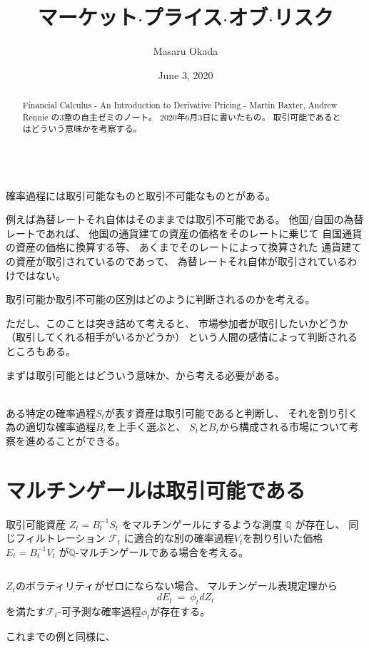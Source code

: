 \documentclass[uplatex,a4j,12pt,dvipdfmx]{jsarticle}
\title{
マーケット$\cdot$プライス$\cdot$オブ$\cdot$リスク
}
\author{Masaru Okada}
\date{June 3, 2020}
\begin{document}
\maketitle

\begin{abstract}
	Financial Calculus - An Introduction to Derivative Pricing - Martin Baxter, Andrew Rennie の3章の自主ゼミのノート。
	2020年6月3日に書いたもの。
	取引可能であるとはどういう意味かを考察する。
\end{abstract}

\ \\

確率過程には取引可能なものと取引不可能なものとがある。

例えば為替レートそれ自体はそのままでは取引不可能である。
他国/自国の為替レートであれば、
他国の通貨建ての資産の価格をそのレートに乗じて
自国通貨の資産の価格に換算する等、
あくまでそのレートによって換算された
通貨建ての資産が取引されているのであって、
為替レートそれ自体が取引されているわけではない。

取引可能か取引不可能の区別はどのように判断されるのかを考える。

ただし、このことは突き詰めて考えると、
市場参加者が取引したいかどうか
（取引してくれる相手がいるかどうか）
という人間の感情によって判断される
ところもある。

まずは取引可能とはどういう意味か、から考える必要がある。

\ \\


ある特定の確率過程$S_{t}$が表す資産は取引可能であると判断し、
それを割り引く為の適切な確率過程$B_{t}$を上手く選ぶと、
$S_{t}$と$B_{t}$から構成される市場について考察を進めることができる。

\section*{マルチンゲールは取引可能である}
取引可能資産
$Z_{t} = B^{-1}_{t} S_{t}$
をマルチンゲールにするような測度
$\mathbb{Q}$
が存在し、
同じフィルトレーション
$\mathcal{F}_{t}$
に適合的な別の確率過程$V_{t}$を割り引いた価格
$E_{t} = B^{-1}_{t} V_{t}$
が$\mathbb{Q}$-マルチンゲールである場合を考える。

${}$

$Z_{t}$のボラティリティがゼロにならない場合、
マルチンゲール表現定理から
$$
	dE_{t}
	\ = \
	\phi_{t} dZ_{t}
$$
を満たす$\mathcal{F}_{t}$-可予測な確率過程$\phi_{t}$が存在する。

これまでの例と同様に、
\end{document}
